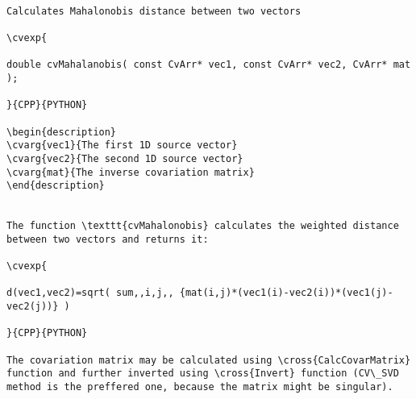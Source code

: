 \begin{verbatim}

Calculates Mahalonobis distance between two vectors

\cvexp{

double cvMahalanobis( const CvArr* vec1, const CvArr* vec2, CvArr* mat );

}{CPP}{PYTHON}

\begin{description}
\cvarg{vec1}{The first 1D source vector}
\cvarg{vec2}{The second 1D source vector}
\cvarg{mat}{The inverse covariation matrix}
\end{description}


The function \texttt{cvMahalonobis} calculates the weighted distance between two vectors and returns it:

\cvexp{

d(vec1,vec2)=sqrt( sum,,i,j,, {mat(i,j)*(vec1(i)-vec2(i))*(vec1(j)-vec2(j))} )

}{CPP}{PYTHON}

The covariation matrix may be calculated using \cross{CalcCovarMatrix} function and further inverted using \cross{Invert} function (CV\_SVD method is the preffered one, because the matrix might be singular).


\end{verbatim}
